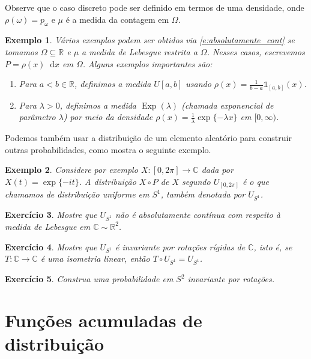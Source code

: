 \documentclass[reqno, final]{book}
\newcommand*\1{\mathds{1}}
\newtheorem{example}{Exemplo}[section]
\newtheorem{exercise}[example]{Exercício}
\DeclareMathOperator{\Exp}{Exp}
\renewcommand*\d{\mathop{}\!\mathrm{d}}
\begin{document}
Observe que o caso discreto pode ser definido em termos de uma densidade, onde $\rho(\omega) = p_\omega$ e $\mu$ é a medida da contagem em $\Omega$.

\begin{example}
  Vários exemplos podem ser obtidos via \eqref{e:absolutamente_cont} se tomamos $\Omega \subseteq \mathbb{R}$ e $\mu$ a medida de Lebesgue restrita a $\Omega$.
  Nesses casos, escrevemos $P = \rho(x) \d x$ em $\Omega$.
  Alguns exemplos importantes são:
  \begin{enumerate}[\quad a)]
  \item Para $a < b \in \mathbb{R}$, definimos a medida $U[a,b]$  usando $\rho(x) = \tfrac{1}{b-a}\1_{[a,b]}(x)$.
  \item Para $\lambda > 0$, definimos a medida $\Exp(\lambda)$  (chamada exponencial de parâmetro $\lambda$) por meio da densidade $\rho(x) = \tfrac{1}{\lambda} \exp\{-\lambda x\}$ em $[0,\infty)$.
  \end{enumerate}
\end{example}

Podemos também usar a distribuição de um elemento aleatório para construir outras probabilidades, como mostra o seguinte exemplo.

\begin{example}
  Considere por exemplo $X:[0,2\pi] \to \mathbb{C}$ dada por $X(t) = \exp\{-i t\}$.
  A distribuição $X \circ P$ de $X$ segundo $U_{[0,2\pi]}$ é o que chamamos de distribuição uniforme em $S^1$, também denotada por $U_{S^1}$.
\end{example}

\begin{exercise}
  Mostre que $U_{S^1}$ não é absolutamente contínua com respeito à medida de Lebesgue em $\mathbb{C} \sim \mathbb{R}^2$.
\end{exercise}

\begin{exercise}
  Mostre que $U_{S^1}$ é invariante por rotações rígidas de $\mathbb{C}$, isto é, se $T:\mathbb{C} \to \mathbb{C}$ é uma isometria linear, então $T \circ U_{S^1} = U_{S^1}$.
\end{exercise}

\begin{exercise}
  Construa uma probabilidade em $S^2$ invariante por rotações.
\end{exercise}

\section{Funções acumuladas de distribuição}
\end{document}
